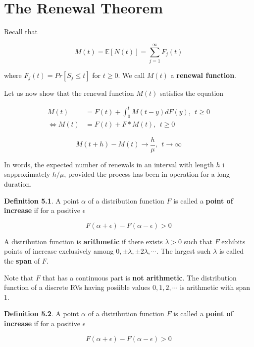 \documentclass[12pt]{article}
\theoremstyle{nonumberbreak}
\begin{document}
\section{The Renewal Theorem}

Recall that 

$$
M(t) = \mathbb{E} [ N(t) ] = \sum_{j=1}^\infty F_j(t)
$$

where $F_j(t) = Pr[ S_j \le t]$ for $t \ge 0$. We call $M(t)$ a \textbf{renewal function}.


Let us now show that the renewal function $M(t)$ satisfies the equation

$$
\begin{aligned}
M(t) &= F(t) + \int_0^t M(t-y) dF(y), \ \ t \ge 0 \\[8pt]
\Leftrightarrow M(t) &= F(t) + F \ast M(t), \ \ t \ge 0
\end{aligned}
$$


$$
M(t + h) - M(t) \to \frac{h}{\mu}, \ \ t \to \infty
$$

In words, the expected number of renewals in an interval with length $h$ i sapproximately $h/\mu$, provided the process has been in operation for a long duration. 



\begin{theorem}
\textbf{Definition 5.1}. A point $\alpha$ of a distribution function $F$ is called a \textbf{point of increase} if for a positive $\epsilon$  

$$
F(\alpha + \epsilon) - F(\alpha - \epsilon) > 0
$$
\end{theorem}

A distribution function is \textbf{arithmetic} if there exists $\lambda >0$ such that $F$ exhibits points of increase exclusively among $0, \pm \lambda, \pm 2\lambda, \cdots$. The largest such $\lambda$ is called the \textbf{span} of $F$.

Note that $F$ that has a continuous part is \textbf{not arithmetic}. The distribution function of a discrete RVs having posiible values $0,1,2,\cdots$ is arithmetic with span $1$. 




\begin{theorem}
\textbf{Definition 5.2}. A point $\alpha$ of a distribution function $F$ is called a \textbf{point of increase} if for a positive $\epsilon$  

$$
F(\alpha + \epsilon) - F(\alpha - \epsilon) > 0
$$
\end{theorem}
\end{document}
